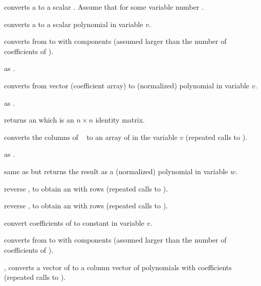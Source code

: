 


 converts a  to a
scalar . Assume that  for some variable
number .

 converts a  to a scalar
polynomial in variable $v$.

 converts from  to 
with  components (assumed larger than the number of coefficients of
).

 as .

 converts from vector (coefficient
array) to (normalized) polynomial in variable $v$.

 as .

 returns an  which is an $n \times n$
identity matrix.

 converts the columns of
~ to an array of  in the variable $v$
(repeated calls to ).

 as .

 same as
 but returns the result as a (normalized) polynomial
in variable $w$.

 reverse , to obtain
an  with  rows (repeated calls to ).

 reverse , to obtain
an  with  rows (repeated calls to ).

 convert coefficients of  to
constant  in variable $v$.


 converts from  to 
with  components (assumed larger than the number of coefficients of
).

, converts a vector of  to a column
vector of polynomials with  coefficients (repeated calls to
).

